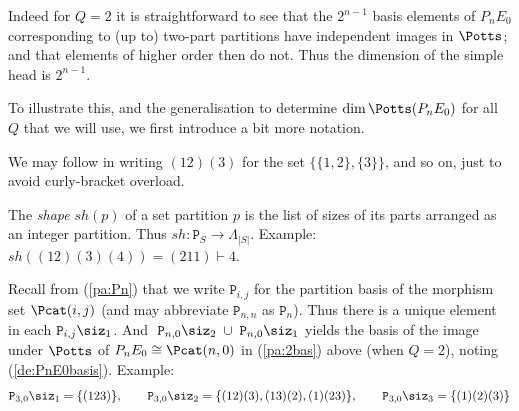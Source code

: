 \documentclass[reqno,10pt,a4paper]{amsart}
\newcommand{\beq}{\begin{equation}}
\newcommand{\eq}{\end{equation}}
\newcommand{\red}[1]{\textcolor{red}{#1}}
\newcommand{\ppm}[1]{\red{#1}}
\newcommand{\ignore}[1]{}
\newcommand{\rmP}{{\mathtt P}} %
\newcommand{\Part}{\rmP}  %
\begin{document}
\mdef  \label{pa:2bas}
Indeed for $Q=2$ it 
is straightforward to see 
that the $2^{n-1}$ basis elements of $P_n E_0$  corresponding to 
(up to) two-part partitions have independent images in $\Potts$; and that elements of higher order then do not.
Thus the dimension of the simple head is $2^{n-1}$. 

\newcommand{\cruder}{<}

\ignore{{ 
For example consider the three-part partition 
$q= \{\{1\},\{2\},\{3\}\}$.
In general we write $p \cruder p'$ 
to mean that $p$ is a 
cruder partition than $p'$.
Thus 
$ \{\{1,2\},\{3\}\} \cruder  \{\{1\},\{2\},\{3\}\} $  
and so on.

$
\Potts(\{\{1,3\},\{2\}\}) = \mat
1&0&1&0&0&1&0&1
\tam ,
$
$
\Potts(\{\{2,3\},\{1\}\}) = \mat
1&0&0&1&1&0&0&1
\tam .
$
So  %
$$
\Potts(q) \; - \; 
\sum_{p < q} %
\left( \Potts(p) -\sum_{p'<p} \Potts(p') \right)
\;=\; \mat 
0&0&0&0&0&0&0&0
\tam 
$$

}}

\medskip

To illustrate this, and the generalisation to 
determine $\dim\Potts(P_n E_0)$ for 
all $Q$ that we will use, 
we first introduce a bit more notation.


\mdef  \label{pa:(123)}
We may  %
follow \cite[Ch.8]{Martin91} in writing $(12)(3)$ for the set $\{ \{1,2\},\{3\}\}$, and so on, just to avoid curly-bracket overload.

\newcommand{\sh}{sh}

\mdef  \label{de:shape}
The {\em shape} $\sh(p)$ of a set partition $p$ is the list of sizes of its parts arranged as an integer partition. Thus $\sh: \Part_S \rightarrow \Lambda_{|S|}$. 
Example: $\sh((12)(3)(4)) = (211)\vdash 4$. 


\mdef  \label{pa:floor1}
Recall 
from (\ref{pa:Pn}) that 
we 
write $\rmP_{i,j}$ 
for the partition basis of 
the morphism set $\Pcat(i,j)$
(and  %
may abbreviate $\rmP_{n,n}$ as $\rmP_n$).
Thus there is a unique element in each 
$\rmP_{i,j}\siz_1$. 
And $\;\rmP_{n,0}\siz_2  \;\cup\;  \rmP_{n,0}\siz_1 $ 
yields the basis of 
the image under $\Potts$  of 
$P_n E_0  \cong \Pcat(n,0)$  in (\ref{pa:2bas}) above
(when $Q=2$),
noting (\ref{de:PnE0basis}).  %
\hspace{1cm} 
%
Example:
\beq  \label{eq:P123}
\rmP_{3,0}\siz_1 = \{   (123)  \}
,\qquad 
\rmP_{3,0}\siz_2 = \{   (12)(3), (13)(2), (1)(23)  \}
,\qquad 
\rmP_{3,0}\siz_3 = \{   (1)(2)(3)  \}
\eq 
\end{document}
